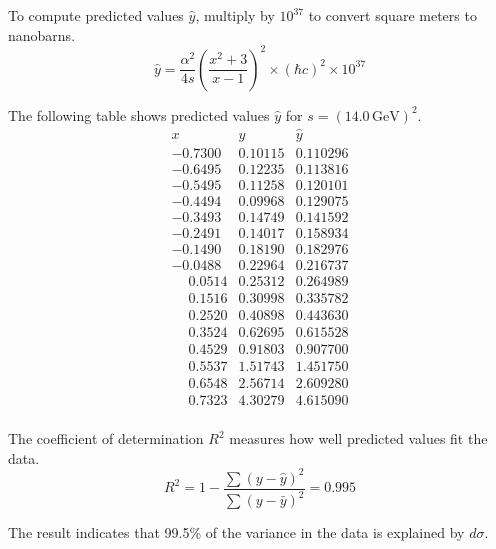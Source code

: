 \documentclass[12pt]{article}
\begin{document}
To compute predicted values $\hat{y}$, multiply by $10^{37}$ to convert square meters to nanobarns.
\begin{equation*}
\hat{y}
=\frac{\alpha^2}{4s}
\left(\frac{x^2+3}{x-1}\right)^2
\times(\hbar c)^2
\times10^{37}
\end{equation*}

The following table shows predicted values $\hat{y}$ for $s=(14.0\,\text{GeV})^2$.
\begin{equation*}
\begin{matrix}
x & y & \hat{y}\\
-0.7300 & 0.10115 & 0.110296\\
-0.6495 & 0.12235 & 0.113816\\
-0.5495 & 0.11258 & 0.120101\\
-0.4494 & 0.09968 & 0.129075\\
-0.3493 & 0.14749 & 0.141592\\
-0.2491 & 0.14017 & 0.158934\\
-0.1490 & 0.18190 & 0.182976\\
-0.0488 & 0.22964 & 0.216737\\
\phantom{+}0.0514 & 0.25312 & 0.264989\\
\phantom{+}0.1516 & 0.30998 & 0.335782\\
\phantom{+}0.2520 & 0.40898 & 0.443630\\
\phantom{+}0.3524 & 0.62695 & 0.615528\\
\phantom{+}0.4529 & 0.91803 & 0.907700\\
\phantom{+}0.5537 & 1.51743 & 1.451750\\
\phantom{+}0.6548 & 2.56714 & 2.609280\\
\phantom{+}0.7323 & 4.30279 & 4.615090\\
\end{matrix}
\end{equation*}

The coefficient of determination $R^2$ measures how well predicted values fit the data.
\begin{equation*}
R^2=1-\frac{\sum(y-\hat{y})^2}{\sum(y-\bar{y})^2}=0.995
\end{equation*}

The result indicates that 99.5\% of the variance in the data is explained by $d\sigma$.
\end{document}

